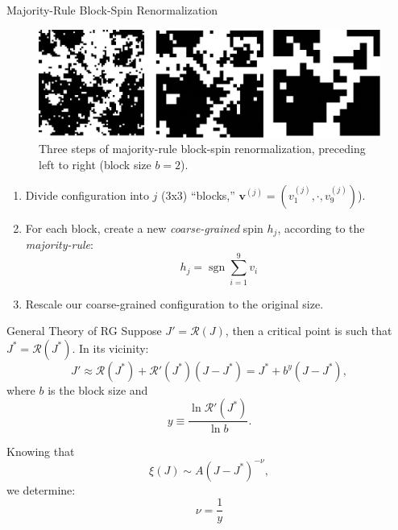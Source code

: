 \documentclass{beamer}
\newcommand{\bolds}[1]{\boldsymbol{#1}}
\newcommand{\bv}{\bolds{v}}
\DeclareMathOperator{\sgn}{sgn}
\begin{document}
\begin{frame}{Majority-Rule Block-Spin Renormalization}
  \begin{figure}[ht]
    \centering
    \includegraphics[width=.8\textwidth]{figures/block-rg.png}
    \caption{Three steps of majority-rule block-spin renormalization,
      preceding left to right (block size $b=2$).\label{fig:block-rg}}
  \end{figure}%
  \begin{enumerate}
  \item Divide configuration into $j$ (3x3) ``blocks,''
    $\bv^{(j)}=(v_1^{(j)},\cdot, v_9^{(j)})$).
  \item For each block, create a new \textit{coarse-grained} spin
    $h_j$, according to the \textit{majority-rule}:
    \begin{equation*}%
      \boxed{h_j=\sgn \sum_{i=1}^9 v_i}
    \end{equation*}%
  \item Rescale our coarse-grained configuration to the original size.
  \end{enumerate}

\end{frame}


\begin{frame}{General Theory of RG}
  Suppose $J' = \mathcal{R}(J)$, then a critical point is such that
  $J^* =\mathcal{R}(J^*)$.  In its vicinity:
  \begin{equation*}
    J'\approx \mathcal{R}(J^*)+ \mathcal{R}'(J^*)(J-J^*) = J^* + b^y(J-J^*),
  \end{equation*}
  where $b$ is the block size and
  \begin{equation*}
    y \equiv \frac{\ln{\mathcal{R}'(J^*)}}{\ln{b}}.
  \end{equation*}

  Knowing that
  \begin{equation*}
    \xi(J) \sim A (J-J^*)^{-\nu},
  \end{equation*}
  we determine:
  \begin{equation*}%
    \boxed{\nu=\frac{1}{y}}
  \end{equation*}%
\end{frame}
\end{document}
